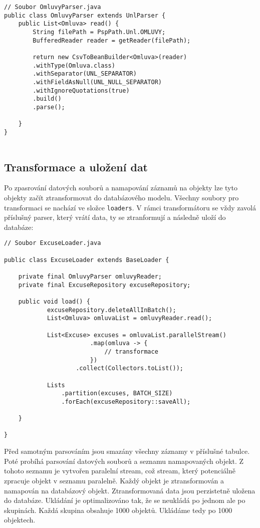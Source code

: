 \begin{lstlisting}[caption={Parsování datového souboru omluvy.unl}, tabsize=2]
// Soubor OmluvyParser.java
public class OmluvyParser extends UnlParser {
	public List<Omluva> read() {
		String filePath = PspPath.Unl.OMLUVY;
		BufferedReader reader = getReader(filePath);
		
		return new CsvToBeanBuilder<Omluva>(reader)
		.withType(Omluva.class)
		.withSeparator(UNL_SEPARATOR)
		.withFieldAsNull(UNL_NULL_SEPARATOR)
		.withIgnoreQuotations(true)
		.build()
		.parse();
		
	}
}
	
\end{lstlisting}

\subsection{Transformace a uložení dat}
Po zpasrování datových souborů a namapování záznamů na objekty lze tyto objekty začít ztransformovat do databázového modelu. Všechny soubory pro transformaci se nachází ve složce \lstinline|loaders|. V rámci transformátoru se vždy zavolá příslušný parser, který vrátí data, ty se ztranformují \linebreak a následně uloží do databáze:

\begin{lstlisting}[caption={Transformace objektu Omluva na databázový objekt Excuse}, tabsize=2]
// Soubor ExcuseLoader.java
	
public class ExcuseLoader extends BaseLoader {

    private final OmluvyParser omluvyReader;
    private final ExcuseRepository excuseRepository;

    public void load() {
			excuseRepository.deleteAllInBatch();
			List<Omluva> omluvaList = omluvyReader.read();
			
			List<Excuse> excuses = omluvaList.parallelStream()
						.map(omluva -> {
							// transformace
						})
					.collect(Collectors.toList());
				
			Lists
				.partition(excuses, BATCH_SIZE)
				.forEach(excuseRepository::saveAll);

	}

}
\end{lstlisting}

\noindent 
Před samotným parsováním jsou smazány všechny záznamy v příslušné tabulce. Poté probíhá parsování datových souborů a seznamu namapovaných objekt. Z tohoto seznamu je vytvořen paralelní stream, což stream, který potenciálně zpracuje objekt v seznamu paralelně. Každý objekt je ztransformován a namapován na databázový objekt. Ztransformovaná data jsou perzistetně uložena do databáze. Ukládání je optimalizováno tak, že se neukládá po jednom ale po skupinách. Každá skupina obsahuje 1000 objektů. Ukládáme tedy po 1000 objektech.

